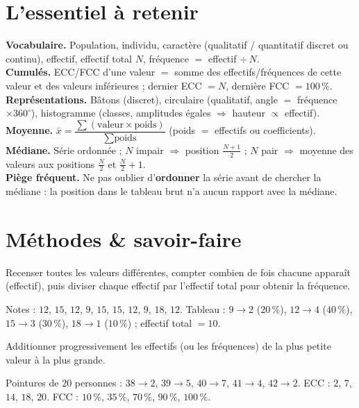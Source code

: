 \section{L'essentiel à retenir}

\begin{synthese}
\textbf{Vocabulaire.} Population, individu, caractère (qualitatif / quantitatif discret ou
continu), effectif, effectif total $N$, fréquence $=$ effectif $\div\, N$.\\[4pt]
\textbf{Cumulés.} ECC/FCC d'une valeur $=$ somme des effectifs/fréquences de cette valeur et
des valeurs inférieures ; dernier ECC $=N$, dernière FCC $=100\,\%$.\\[4pt]
\textbf{Représentations.} Bâtons (discret), circulaire (qualitatif, angle $=$ fréquence
$\times360^{\circ}$), histogramme (classes, amplitudes égales $\Rightarrow$ hauteur
$\propto$ effectif).\\[4pt]
\textbf{Moyenne.} $\bar{x}=\dfrac{\sum(\text{valeur}\times\text{poids})}{\sum\text{poids}}$
(poids $=$ effectifs ou coefficients).\\[4pt]
\textbf{Médiane.} Série ordonnée ; $N$ impair $\Rightarrow$ position $\frac{N+1}{2}$ ; $N$
pair $\Rightarrow$ moyenne des valeurs aux positions $\frac N2$ et $\frac N2+1$.\\[4pt]
\textbf{Piège fréquent.} Ne pas oublier d'\textbf{ordonner} la série avant de chercher la
médiane : la position dans le tableau brut n'a aucun rapport avec la médiane.
\end{synthese}

\section{Méthodes \& savoir-faire}

Recenser toutes les valeurs différentes, compter combien de fois chacune apparaît
(effectif), puis diviser chaque effectif par l'effectif total pour obtenir la fréquence.
\begin{exemple}
Notes : $12$, $15$, $12$, $9$, $15$, $15$, $12$, $9$, $18$, $12$. Tableau : $9\to2$
($20\,\%$), $12\to4$ ($40\,\%$),
$15\to3$ ($30\,\%$), $18\to1$ ($10\,\%$) ; effectif total $=10$.
\end{exemple}

Additionner progressivement les effectifs (ou les fréquences) de la plus petite valeur à
la plus grande.
\begin{exemple}
Pointures de $20$ personnes : $38\to2$, $39\to5$, $40\to7$, $41\to4$, $42\to2$. ECC :
$2$, $7$, $14$, $18$, $20$. FCC : $10\,\%$, $35\,\%$, $70\,\%$, $90\,\%$, $100\,\%$.
\end{exemple}

